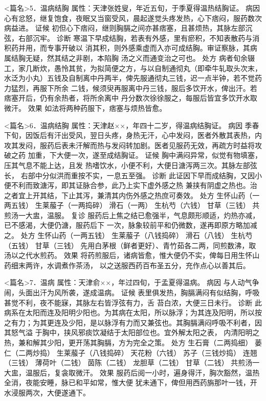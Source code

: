 \documentclass[a4paper,12pt,UTF8,twoside]{ctexbook}
\begin{document}
<篇名>5．温病结胸
属性：天津张姓叟，年近五旬，于季夏得温热结胸证。 
病因 心有忿怒，继复饱食，夜眠又当窗受风，晨起遂觉头疼发热，心下痞闷，服药数次病益进。 
证候 初但心下痞闷，继则胸膈之间亦甚痞塞，且甚烦热，其脉左部沉弦，右部沉牢。 
诊断 寒温下早成结胸，若表有外感，里有瘀积，不知表散药与消积药并用，而专事开破以 
消其积，则外感乘虚而入亦可成结胸。审证察脉，其病属结胸无疑，然其结之非剧，本陷胸 
汤之义而通变治之可也。 
处方 病者旬余辍工，家几断炊，愚怜其贫，为拟简便之方，与以自制通彻丸（即牵牛轧取头次末， 
水泛为小丸）五钱及自制离中丹两半，俾先服通彻丸三钱，迟一点半钟，若不觉药力猛烈，再服下所余 
二钱，候须臾再服离中丹三钱，服后多饮开水，俾出汗。若痞塞开后，仍有余热者，将所余离中 
丹分数次徐徐服之，每服后皆宜多饮开水取微汗。 
效果 如法将两种药服下，痞塞与烦热皆愈。 


<篇名>6．温病结胸
属性：天津赵××，年四十二岁，得温病结胸证。 
病因 季春下旬，因饭后有汗出受风，翌日头疼，身热无汗，心中发闷，医者外散其表热，内 
攻其发闷，服药后表未汗解而热与发闷转加剧。医者见服药无效，再疏方时益将攻破之药 
加重，下大便一次，遂至成结胸证。 
证候 胸中满闷异常，似觉有物填塞，压其气息不能上达，且发 
热嗜饮水，小便不利，大便日溏泻两三次。其脉左部弦长， 
右部中分似洪而重按不实，一息五至强。 
诊断 此证因下早而成结胸，又因小便不利而致溏泻，即其证脉合参，此乃上实下虚外感之热 
兼挟有阴虚之热也。治之者宜上开其结，下止其泻，兼清其内伤外感之热庶可奏效。 
处方 生怀山药（一两五钱） 生莱菔子（一两捣碎） 滑石（一两） 生杭芍（六钱） 
甘草（三钱） 
共煎汤一大盅，温服。 
复诊 服药后上焦之结已愈强半，气息颇形顺适，灼热亦减，已不感渴，大便仍溏，服药后下 
一次，脉象较前平和仍微数，遂再即原方略加减之。 
处方 生怀山药（一两五钱） 生莱菔子（八钱捣碎） 滑石（八钱） 生杭芍（五钱） 甘草（三钱） 
先用白茅根（鲜者更好）、青竹茹各二两，同煎数沸，取汤以之代水煎药。 
效果 将药煎服后，诸病皆愈，惟大便仍不实，俾每日用生怀山药细末两许，水调煮作茶汤， 
以之送服西药百布圣五分，充作点心以善其后。 


<篇名>7．温病
属性：天津俞××，年过四旬，于孟夏得温病。 
病因 与人动气争闹，头面出汗为风所袭，遂成温病。 
证候 表里俱发热，胸膈满闷有似结胸，呼吸甚觉不利，夜不能寐，其脉左右皆浮弦有力，舌 
苔白浓，大便三日未行。 
诊断 此病系在太阳而连及阳明少阳也。为其病在太阳，所以脉浮；为其连及阳明，所以按 
之有力；为其更连及少阳，是以脉浮有力而又兼弦也。其胸膈满闷呼吸不利者，因其怒气溢 
于胸中，挟风邪痰饮凝结于太阳部位也。宜外解太阳之表， 
内清阳明之热，兼和解其少阳，更开荡其胸膈，方为完全之策。 
处方 生石膏（二两捣细） 蒌仁（二两炒捣） 生莱菔子（八钱捣碎） 天花粉（六钱） 
苏子（三钱炒捣） 连翘（三钱） 薄荷叶（二钱） 茵陈（二钱） 龙胆草（二钱） 甘草（二钱） 
共煎汤一大盅，温服后，复衾取微汗。 
效果 服药后阅一小时，遍身得汗，胸次豁然，温热全消，夜能安睡，脉已和平如常，惟大便 
犹未通下，俾但用西药旃那叶一钱，开水浸服两次，大便遂通下。 
\end{document}
